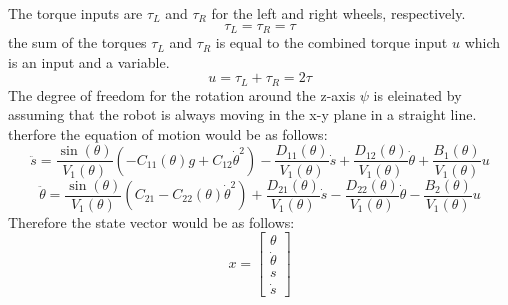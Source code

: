 The torque inputs are $\tau_L$ and $\tau_R$ for the left and right wheels, respectively.
\begin{equation}
	\tau_L = \tau_R = \tau
\end{equation}
the sum of the torques $\tau_L$ and $\tau_R$ is equal to the combined torque input $u$ which is an input and a variable.
\begin{equation}
	u = \tau_L + \tau_R = 2\tau
\end{equation}
The degree of freedom for the rotation around the z-axis $\psi$ is eleinated by assuming that the robot is always moving in the x-y plane in a straight line. therfore the equation of motion would be as follows:
\begin{equation}
	\ddot{s} = \frac{\sin(\theta)}{V_1(\theta)} \left( -C_{11}(\theta)g + C_{12}\dot{\theta}^2 \right) - \frac{D_{11}(\theta)}{V_1(\theta)}\dot{s} + \frac{D_{12}(\theta)}{V_1(\theta)}\dot{\theta} + \frac{B_{1}(\theta)}{V_1(\theta)}u
\end{equation}
\begin{equation}
	\ddot{\theta} = \frac{\sin(\theta)}{V_1(\theta)} \left( C_{21} - C_{22}(\theta)\dot{\theta}^2 \right) + \frac{D_{21}(\theta)}{V_1(\theta)}\dot{s} - \frac{D_{22}(\theta)}{V_1(\theta)}\dot{\theta} - \frac{B_{2}(\theta)}{V_1(\theta)}u
\end{equation}
Therefore the state vector would be as follows:
\begin{equation}
	x = \begin{bmatrix}
		\theta \\
		\dot{\theta}\\
		s \\
		\dot{s}
	\end{bmatrix}
\end{equation}

